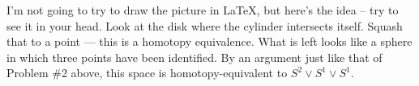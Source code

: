 \vfill


\soln I'm not going to try to draw the picture in LaTeX, but here's the idea -- try to see it in your head.  Look at the disk where the cylinder intersects itself.  Squash that to a point --- this is a homotopy equivalence.  What is left looks like a sphere in which three points have been identified.  By an argument just like that of Problem \#2 above, this space is homotopy-equivalent to $S^2\vee S^1\vee S^1$.


